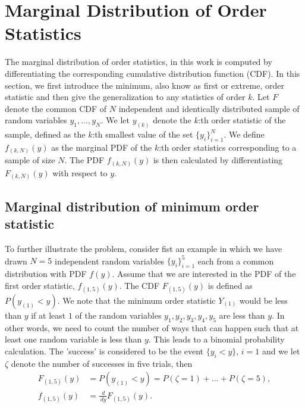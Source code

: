 \documentclass{article}
\begin{document}
\section{Marginal Distribution of Order Statistics}\label{sec:marginal_distribution_of_order_statistics}
The marginal distribution of order statistics, in this work is computed by differentiating the corresponding cumulative distribution function (CDF). In this section, we first introduce the minimum, also know as first or extreme, order statistic and then give the generalization to any statistics of order $k$. Let $F$ denote the common CDF of $N$ independent and identically distributed sample of random variables $y_1,\ldots,y_N$. We let $y_{(k)}$ denote the $k$:th order statistic of the sample, defined as the $k$:th smallest value of the set $\{y_i\}_{i=1}^N$. We define $f_{(k,N)}(y)$ as the marginal PDF of the $k$:th order statistics corresponding to a sample of size $N$. The PDF $f_{(k,N)}(y)$ is then calculated by differentiating $F_{(k,N)}(y)$ with respect to $y$.

\subsection{Marginal distribution of minimum order statistic}\label{subsec:marginal_distribution}
To further illustrate the problem, consider fist an example in which we have drawn $N=5$ independent random variables $\{y_i\}_{i=1}^5$ each from a common distribution with PDF $f(y)$.  Assume that we are interested in the PDF of the first order statistic, $f_{(1,5)}(y)$. The CDF $F_{(1,5)}(y)$ is defined as $P(y_{(1)} < y)$. We note that the minimum order statistic $Y_{(1)}$ would be less than $y$ if at least $1$ of the random variables $y_1, y_2, y_3, y_4, y_5$ are less than $y$. In other words, we need to count the number of ways that can happen such that at least one random variable is less than $y$. This leads to a binomial probability calculation. The 'success' is considered to be the event $\{y_i < y\}$, $i = 1$ and we let $\zeta$ denote the number of successes in five trials, then
%
%
\begin{align*}
F_{(1,5)}(y) &= P(y_{(1)}<y) = P(\zeta=1)+\ldots + P(\zeta=5),\\
f_{(1,5)}(y) &= \frac{\,d}{\,dy}F_{(1,5)}(y).
\end{align*}
%
%
\end{document}

